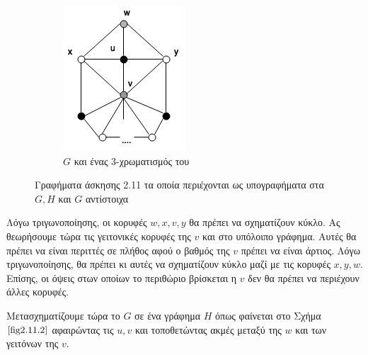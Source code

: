 \documentclass[a4paper, oneside, 11pt]{article}
\theoremstyle{definition}
\begin{document}
\begin{enumerate}
\begin{itemize}
\begin{itemize}
\begin{figure}
\begin{subfigure}[b]{0.3\textwidth}
                  \includegraphics[width=\textwidth]{./pics/fig3.png}
                  \caption{$G$ και ένας 3-χρωματισμός του}
                  \label{fig2.11.3}
               \end{subfigure}
               \caption{Γραφήματα άσκησης 2.11 τα οποία περιέχονται
               ως υπογραφήματα στα $G, H$ και $G$ αντίστοιχα}  
               \label{fig2.11.4}
            \end{figure}

            Λόγω τριγωνοποίησης, οι κορυφές $w, x, v, y$ θα πρέπει να
            σχηματίζουν κύκλο. Ας θεωρήσουμε τώρα τις γειτονικές κορυφές
            της $v$ και στο υπόλοιπο γράφημα. Αυτές θα πρέπει να είναι
            περιττές σε πλήθος αφού ο βαθμός της $v$ πρέπει να είναι
            άρτιος.
            Λόγω τριγωνοποίησης, θα πρέπει
            κι αυτές να σχηματίζουν κύκλο μαζί με τις
            κορυφές $x, y, w$. Επίσης, οι όψεις στων οποίων το περιθώριο
            βρίσκεται η $v$ δεν θα πρέπει να περιέχουν άλλες κορυφές.

            Μετασχηματίζουμε τώρα το $G$ σε ένα γράφημα $H$ όπως φαίνεται
            στο Σχήμα $\ref{fig2.11.2}$ αφαιρώντας τις $u, v$ και τοποθετώντας
            ακμές μεταξύ της $w$ και των γειτόνων της $v$.


\end{itemize}
\end{itemize}
\end{enumerate}
\end{document}
